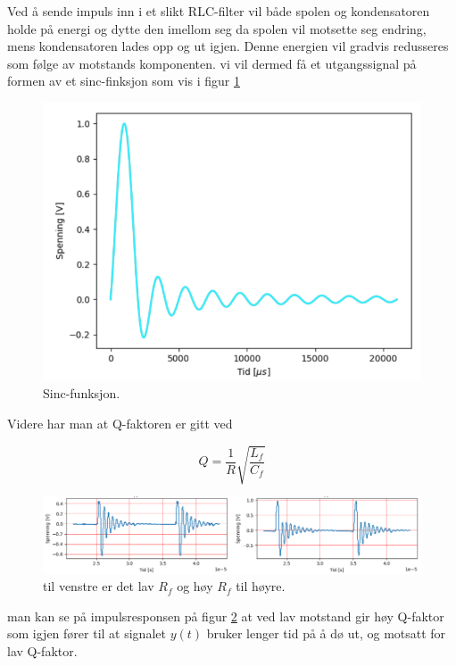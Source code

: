 Ved å sende impuls inn i et slikt RLC-filter vil både spolen og kondensatoren holde på energi og dytte den imellom seg da spolen vil motsette seg endring, mens kondensatoren lades opp og ut igjen. Denne energien vil gradvis redusseres som følge av motstands komponenten. vi vil dermed få et utgangssignal på formen av et sinc-finksjon som vis i figur \ref{fig:sinc}

\begin{figure}[!hbt]
	\centering
	\includegraphics[scale=0.5]{./Images/02Concept/11sinc.png}
	\caption{Sinc-funksjon.}
    \label{fig:sinc}
\end{figure}

Videre har man at Q-faktoren er gitt ved

\begin{equation}
	Q=\frac{1}{R} \sqrt{\frac{L_f}{C_f}}
\end{equation}

\begin{figure}[!hbt]
	\centering
	\includegraphics[scale=0.5]{./Images/02Concept/12sinccc.png}
	\caption{til venstre er det lav $R_f$ og høy $R_f$ til høyre.}
    \label{fig:sinccc}
\end{figure}

man kan se på impulsresponsen på figur \ref{fig:sinccc} at ved lav motstand gir høy Q-faktor som igjen fører til at signalet $y(t)$ bruker lenger tid på å dø ut, og motsatt for lav Q-faktor.

